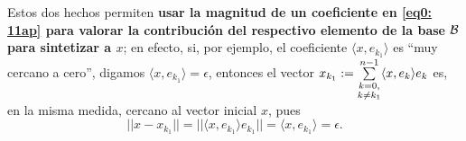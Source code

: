 \begin{nota}
Estos dos hechos permiten \textbf{usar la magnitud de un coeficiente en 
\eqref{eq0: 11ap} para valorar la contribución del respectivo 
elemento de la base $\mathcal{B}$ para sintetizar a $x$};
en efecto, si, por ejemplo, el coeficiente $\langle x, e_{k_{1}} \rangle$
es ``muy cercano a cero'', digamos $\langle x, e_{k_{1}} \rangle = \epsilon$,  
entonces el vector 
$x_{k_{1}}:= \sum\limits_{\substack{ {k=0}, \\  {k \neq k_{1}} }}^{n-1}
\langle x , e_{k} \rangle e_{k}$
es, en la misma medida, cercano al vector inicial $x$, pues
\[
|| x - x_{k_{1}} || = || \langle x , e_{k_{1}} \rangle e_{k_{1}} ||
= \langle x , e_{k_{1}} \rangle = \epsilon.
\]
\end{nota}


\begin{comment}
Ya estamos listos par dar un ejemplo de una BON que
no es una base de Hamel.

\begin{ejemplo}
(de un subconjunto de un espacio
con producto punto que sea maximal ortonormal pero no maximal l.i.)
\TODO{Dónde introduzco al espacio de sucesiones $\ell^{2}$??
Yo creo que justo después de G-S, o sea, justo antes de esta.}

Considere al espacio de Hilbert
\[
\ell^{2}= \{ x: \IN \longrightarrow \IR | \hspace{0.2cm} 
\suma{k=1}{\infty}{|x_{k}|^{2}}< \infty \}
\]

con el producto punto
\[
<x,y>= \suma{k=1}{\infty}{x_{k}y_{k}}.
\]

Sea el subconjunto de este
\[
\cali{B}:= \{e_{i}: \IN \longrightarrow \IR| \hspace{0.2cm} i \in \IN \},
\]

donde $e_{i}$ es la sucesión dada por la regla
\[
e_{i}(j)=\delta_{i,j}, \hspace{0.4cm} j \in \IN.
\]


\begin{itemize}
\item[i)]($\cali{B}$ es un subconjunto maximal ortonormal) 
Claro que todos los elementos de $\cali{B}$ tienen norma uno;
además, si $x \in \ell^{2}$ es tal que para todo índice $i$
se tiene la igualdad
\[
x_{i}= \suma{k=1}{\infty}{x(k)e_{i}(k)}=<x,e_{i}>=0,
\]
entonces $x$ es la sucesión cero, o sea,
el elemento cero del espacio
$\ell^{2}$. Según la equivalencia
$a) \iff b)$ del teorema \ref{thm: Coway, 4.13}, esto basta
para demostrar que $\cali{B}$ es BON de $\ell^{2}$.

\item

\end{itemize}


\TODO{AAAAA}

\end{ejemplo}
\end{comment}



